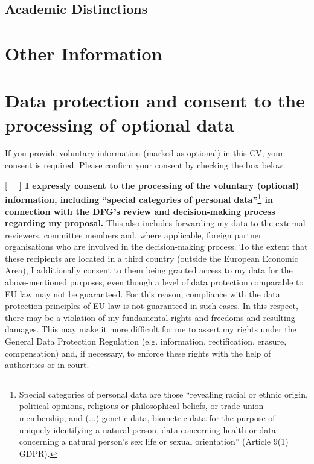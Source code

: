 \documentclass{scrartcl}
\begin{document}
\subsection*{Academic Distinctions}

\section*{Other Information}

\section*{Data protection and consent to the processing of optional data}
If you provide voluntary information (marked as optional) in this CV, your consent is required. Please confirm your consent by checking the box below. 

$[\hspace{0.5cm}]$ \textbf{I expressly consent to the processing of the voluntary (optional) information, including  ``special categories of personal data''\footnote{Special categories of personal data are those ``revealing racial or ethnic origin, political opinions, religious or philosophical beliefs, or trade union membership, and (...) genetic data, biometric data for the purpose of uniquely identifying a natural person, data concerning health or data concerning a natural person's sex life or sexual orientation'' (Article 9(1) GDPR).}  in connection with the DFG's review and decision-making process regarding my proposal.} This also includes forwarding my data to the external reviewers, committee members and, where applicable, foreign partner organisations who are involved in the decision-making process. To the extent that these recipients are located in a third country (outside the European Economic Area), I additionally consent to them being granted access to my data for the above-mentioned purposes, even though a level of data protection comparable to EU law may not be guaranteed. For this reason, compliance with the data protection principles of EU law is not guaranteed in such cases. In this respect, there may be a violation of my fundamental rights and freedoms and resulting damages. This may make it more difficult for me to assert my rights under the General Data Protection Regulation (e.g. information, rectification, erasure, compensation) and, if necessary, to enforce these rights with the help of authorities or in court.
\end{document}
